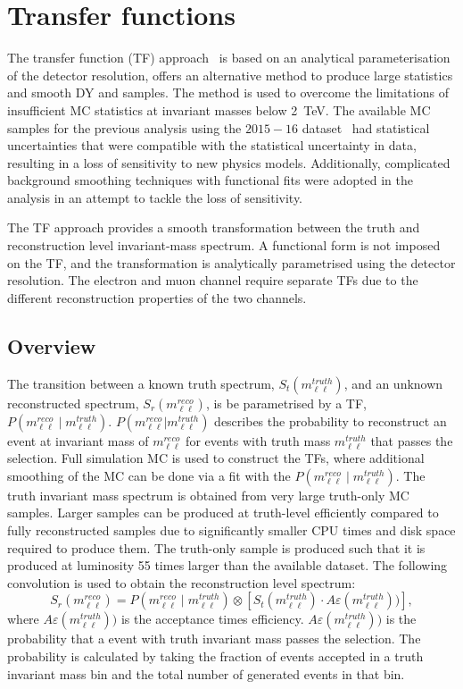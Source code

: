 \section{Transfer functions}\label{sec:datamc:transfer}
The transfer function (TF) approach~\cite{Aad:2019fac} is based on an analytical parameterisation of the detector resolution, offers an alternative method to produce large statistics and smooth DY and \ttbar samples. The method is used to overcome the limitations of insufficient MC statistics at invariant masses below \SI{2}{\tera\electronvolt}. The available MC samples for the previous analysis using the $2015-16$ dataset~\cite{EXOT-2016-05} had statistical uncertainties that were compatible with the statistical uncertainty in data, resulting in a loss of sensitivity to new physics models. Additionally, complicated background smoothing techniques with functional fits were adopted in the analysis in an attempt to tackle the loss of sensitivity.

The TF approach provides a smooth transformation between the truth and reconstruction level invariant-mass spectrum. A functional form is not imposed on the TF, and the transformation is analytically parametrised using the detector resolution. The electron and muon channel require separate TFs due to the different reconstruction properties of the two channels.

\subsection{Overview}
The transition between a known truth spectrum, $S_t(m_{\ell\ell}^{truth})$, and an unknown reconstructed spectrum, $S_r(m_{\ell\ell}^{reco})$, is be parametrised by a TF, $P(m_{\ell\ell}^{reco} \mid m_{\ell\ell}^{truth})$. $P(m_{\ell\ell}^{reco} | m_{\ell\ell}^{truth})$ describes the probability to reconstruct an event at invariant mass of $m_{\ell\ell}^{reco}$ for events with truth mass $m_{\ell\ell}^{truth}$ that passes the selection. Full simulation MC is used to construct the TFs, where additional smoothing of the MC can be done via a fit with the $P(m_{\ell\ell}^{reco} \mid m_{\ell\ell}^{truth})$.  The truth invariant mass spectrum is obtained from very large truth-only MC samples. Larger samples can be produced at truth-level efficiently compared to fully reconstructed samples due to significantly smaller CPU times and disk space required to produce them. The truth-only sample is produced such that it is produced at luminosity 55 times larger than the available dataset. The following convolution is used to obtain the reconstruction level spectrum: 
\begin{equation}\label{eq:TF_generalConv}
	S_r(m_{\ell\ell}^{reco}) = P(m_{\ell\ell}^{reco} \mid m_{\ell\ell}^{truth}) \otimes \left[ S_t(m_{\ell\ell}^{truth}) \cdot A\varepsilon(m_{\ell\ell}^{truth})) \right], 
\end{equation}
where $A\varepsilon(m_{\ell\ell}^{truth}))$ is the acceptance times efficiency. $A\varepsilon(m_{\ell\ell}^{truth}))$ is the probability that a event with truth invariant mass passes the selection. The probability is calculated by taking the fraction of events accepted in a truth invariant mass bin and the total number of generated events in that bin. 


